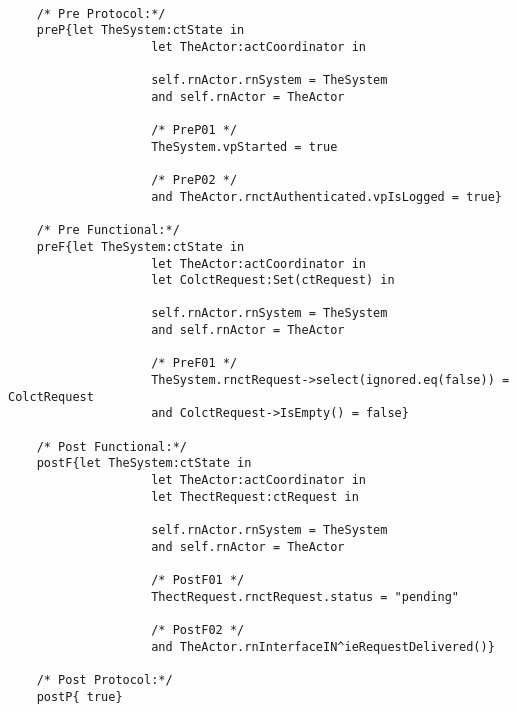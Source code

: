 	\scriptsize
	\vspace{0.5cm}
	\begin{lstlisting}[style=MessirStyle,firstnumber=auto,captionpos=b,caption={\msrmessir (MCL-oriented) specification of the operation \emph{oeDeliverRequest}.},label=OM-actCoordinator-oeDeliverRequest-MCL-LST]

	/* Pre Protocol:*/ 
	preP{let TheSystem:ctState in
					let TheActor:actCoordinator in
					
					self.rnActor.rnSystem = TheSystem
					and self.rnActor = TheActor
					
					/* PreP01 */
					TheSystem.vpStarted = true
					
					/* PreP02 */
					and TheActor.rnctAuthenticated.vpIsLogged = true}
	
	/* Pre Functional:*/
	preF{let TheSystem:ctState in
					let TheActor:actCoordinator in
					let ColctRequest:Set(ctRequest) in
					
					self.rnActor.rnSystem = TheSystem
					and self.rnActor = TheActor
					
					/* PreF01 */
					TheSystem.rnctRequest->select(ignored.eq(false)) = ColctRequest
					and ColctRequest->IsEmpty() = false}
	
	/* Post Functional:*/ 
	postF{let TheSystem:ctState in
					let TheActor:actCoordinator in
					let ThectRequest:ctRequest in
					
					self.rnActor.rnSystem = TheSystem
					and self.rnActor = TheActor
					
					/* PostF01 */
					ThectRequest.rnctRequest.status = "pending"
					
					/* PostF02 */
					and TheActor.rnInterfaceIN^ieRequestDelivered()}
	
	/* Post Protocol:*/ 
	postP{ true}
	
	\end{lstlisting}
	\normalsize 
	
	
	
	





